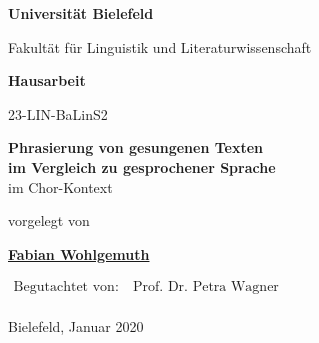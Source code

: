\begin{center}

\Huge{\textbf{Universität Bielefeld}}

\LARGE{Fakultät für Linguistik und Literaturwissenschaft}

\vfill

\LARGE{\textbf{Hausarbeit}}

\Large

23-LIN-BaLinS2

\vfill


\vspace*{1cm}

\LARGE{\textbf{Phrasierung von gesungenen Texten\\im Vergleich zu gesprochener Sprache}\\im Chor-Kontext}

\Large

\vfill

vorgelegt von

\vspace*{1cm}

\textbf{\href{https://fabianwohlgemuth.de}{Fabian Wohlgemuth}}

\vfill

$\begin{aligned}
\text{Begutachtet von:}&\ \text{Prof. Dr. Petra Wagner}\\
\end{aligned}$

\vfill

Bielefeld, Januar 2020

\end{center}
\restoregeometry